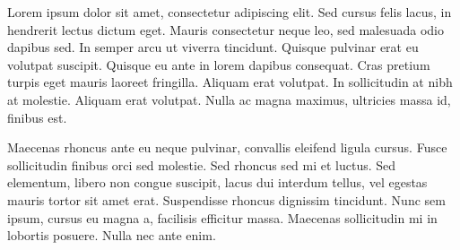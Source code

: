 

Lorem ipsum dolor sit amet, consectetur adipiscing elit. Sed cursus felis lacus, in hendrerit lectus dictum eget. Mauris consectetur neque leo, sed malesuada odio dapibus sed. In semper arcu ut viverra tincidunt. Quisque pulvinar erat eu volutpat suscipit. Quisque eu ante in lorem dapibus consequat. Cras pretium turpis eget mauris laoreet fringilla. Aliquam erat volutpat. In sollicitudin at nibh at molestie. Aliquam erat volutpat. Nulla ac magna maximus, ultricies massa id, finibus est.

Maecenas rhoncus ante eu neque pulvinar, convallis eleifend ligula cursus. Fusce sollicitudin finibus orci sed molestie. Sed rhoncus sed mi et luctus. Sed elementum, libero non congue suscipit, lacus dui interdum tellus, vel egestas mauris tortor sit amet erat. Suspendisse rhoncus dignissim tincidunt. Nunc sem ipsum, cursus eu magna a, facilisis efficitur massa. Maecenas sollicitudin mi in lobortis posuere. Nulla nec ante enim.

